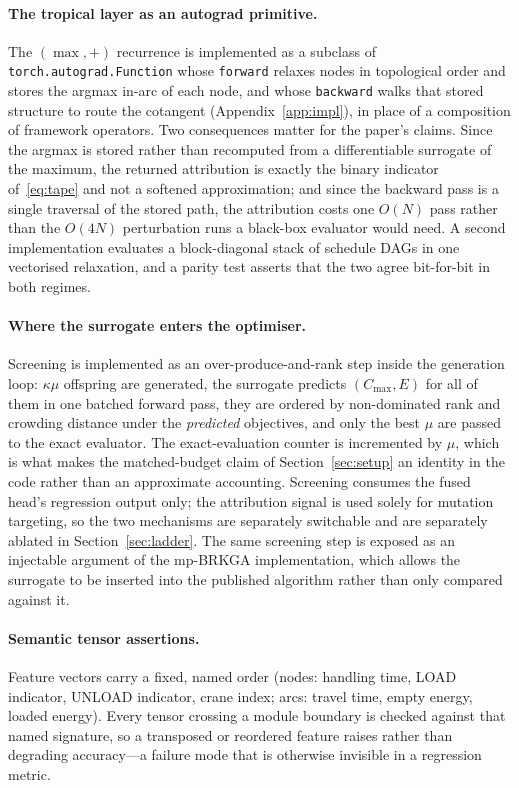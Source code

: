 \documentclass[11pt]{article}
\newcommand{\Cmax}{C_{\max}}
\begin{document}
\paragraph{The tropical layer as an autograd primitive.} The $(\max,+)$ recurrence is
implemented as a subclass of
\texttt{torch.\allowbreak autograd.\allowbreak Function} whose \texttt{forward} relaxes nodes in topological order
and stores the argmax in-arc of each node, and whose \texttt{backward} walks that stored
structure to route the cotangent (Appendix~\ref{app:impl}), in place of a composition of
framework operators. Two consequences matter for the
paper's claims. Since the argmax is stored rather than recomputed from a differentiable
surrogate of the maximum, the returned attribution is exactly the binary indicator
of~\eqref{eq:tape} and not a softened approximation; and since the backward pass is a single
traversal of the stored path, the attribution costs one $O(N)$ pass rather than the $O(4N)$
perturbation runs a black-box evaluator would need. A second implementation evaluates a
block-diagonal stack of schedule DAGs in one vectorised relaxation, and a parity test asserts
that the two agree bit-for-bit in both regimes.

\paragraph{Where the surrogate enters the optimiser.} Screening is implemented as an
over-produce-and-rank step inside the generation loop: $\kappa\mu$ offspring are generated,
the surrogate predicts $(\Cmax,E)$ for all of them in one batched forward pass, they are
ordered by non-dominated rank and crowding distance under the \emph{predicted} objectives,
and only the best $\mu$ are passed to the exact evaluator. The exact-evaluation counter is
incremented by $\mu$, which is what makes the matched-budget claim of
Section~\ref{sec:setup} an identity in the code rather than an approximate accounting.
Screening consumes the fused head's regression output only; the attribution signal is used
solely for mutation targeting, so the two mechanisms are separately switchable and are
separately ablated in Section~\ref{sec:ladder}. The same screening step is exposed as an
injectable argument of the mp-BRKGA implementation, which allows the surrogate to be inserted
into the published algorithm rather than only compared against it.

\paragraph{Semantic tensor assertions.} Feature vectors carry a fixed, named order
(nodes: handling time, LOAD indicator, UNLOAD indicator, crane index; arcs: travel time,
empty energy, loaded energy). Every tensor crossing a module boundary is checked against that
named signature, so a transposed or reordered feature raises rather than degrading
accuracy---a failure mode that is otherwise invisible in a regression metric.
\end{document}
